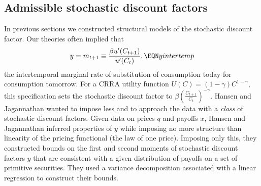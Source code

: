 \subsection{Admissible stochastic discount factors}

   In previous sections we constructed structural models of the stochastic
discount factor. Our
theories often implied that
$$ y = m_{t+1} \equiv {\beta u'(C_{t+1})\over u'(C_t) }, \EQN yintertemp $$
the intertemporal marginal rate of substitution of consumption today for consumption
tomorrow.  For a  CRRA utility function $U(C) = (1-\gamma) C^{1-\gamma}$, this specification
sets the stochastic discount factor to $\beta \left(\frac{C_{t+1}}{C_{t}}\right)^{- \gamma}$.
 Hansen and Jagannathan wanted to impose less and to approach the data with a {\it class\/}
of stochastic discount factors.
  Given data on prices $q$ and  payoffs $x$,
Hansen and Jagannathan inferred properties
of $y$ while imposing no more structure than linearity
of the pricing functional (the law of one price).  Imposing only this,
they constructed bounds on the first and second moments of stochastic
discount factors $y$ that are consistent with a given distribution
of payoffs on a  set of primitive securities.  %
They  used a variance decomposition associated with a linear regression   to construct their bounds.

